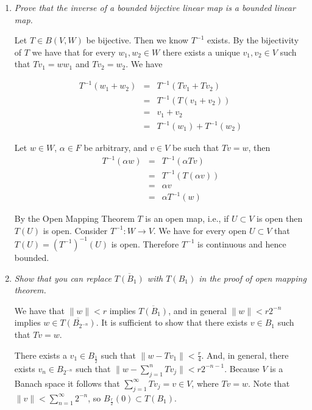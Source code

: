 \documentclass[11pt]{article}
\begin{document}
\begin{enumerate}
\item \emph{Prove that the inverse of a bounded bijective linear map is a bounded linear map.}

Let $T \in B(V,W)$ be bijective.  Then we know $T^{-1}$ exists.  By the bijectivity of $T$ we have that for every $w_1,w_2 \in W$ there exists a unique $v_1,v_2 \in V$ such that $Tv_1 = ww_1$ and $Tv_2 = w_2$.  We have

\begin{eqnarray*}
T^{-1}(w_1 + w_2) &=& T^{-1}(Tv_1 + Tv_2) \\
&=& T^{-1}(T(v_1 + v_2)) \\
&=& v_1 + v_2 \\
&=& T^{-1}(w_1) + T^{-1}(w_2)
\end{eqnarray*}

Let $w \in W$, $\alpha \in F$ be arbitrary, and $v \in V$ be such that $Tv = w$, then
\begin{eqnarray*}
T^{-1}(\alpha w) &=& T^{-1}(\alpha Tv) \\
&=& T^{-1}(T(\alpha v)) \\
&=& \alpha v \\
&=& \alpha T^{-1}(w)
\end{eqnarray*}

By the Open Mapping Theorem $T$ is an open map, i.e., if $U \subset V$ is open then $T(U)$ is open.  Consider $T^{-1}: W \rightarrow V$.  We have for every open $U \subset V$ that $T(U) = (T^{-1})^{-1}(U)$ is open.  Therefore $T^{-1}$ is continuous and hence bounded.

\item \emph{Show that you can replace $\overline{T(B_1)}$ with $T(B_1)$ in the proof of open mapping theorem.}

We have that $\|w\| < r$ implies $\overline{T(B_1)}$, and in general $\|w\| < r2^{-n}$ implies $w \in \overline{T(B_{2^{-n}})}$.  It is sufficient to show that there exists $v \in  B_1$ such that $Tv = w$.

There exists a $v_1 \in B_{\frac{1}{2}}$ such that $\|w - Tv_1\| < \frac{r}{4}$.  And, in general, there exists $v_n \in B_{2^{-n}}$ such that $\|w - \sum_{j=1}^n Tv_j \| < r 2^{-n-1}$.  Because $V$ is a Banach space it follows that $\sum_{j=1}^\infty Tv_j = v \in V$, where $Tv = w$.  Note that $\|v\| < \sum_{n=1}^\infty 2^{-n}$, so $B_{\frac{r}{2}}(0) \subset T(B_1)$.

\end{enumerate}
\end{document}
